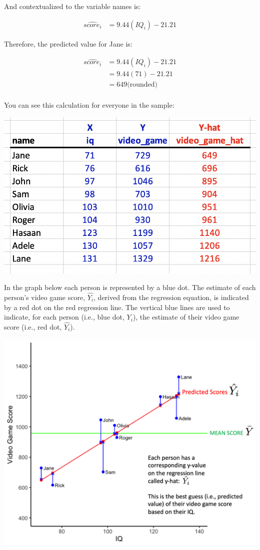 \documentclass[
]{krantz}
\begin{document}
And contextualized to the variable names is:

\[
\begin{aligned}
\widehat{score_i} &= 9.44(IQ_i) -21.21
\end{aligned}
\]

Therefore, the predicted value for Jane is:

\[
\begin{aligned}
\widehat{score_i} &= 9.44(IQ_i) -21.21 \\
&= 9.44(71) - 21.21 \\
&= 649 \text{(rounded)} \\
\end{aligned}
\]

You can see this calculation for everyone in the sample:

\includegraphics[width=13.61in]{ch_correlation/images/yhat_data}

In the graph below each person is represented by a blue dot. The estimate of each person's video game score, \(\hat{Y_i}\), derived from the regression equation, is indicated by a red dot on the red regression line. The vertical blue lines are used to indicate, for each person (i.e., blue dot, \(Y_i\)), the estimate of their video game score (i.e., red dot, \(\hat{Y_i}\)).

\includegraphics[width=0.8\linewidth]{ch_correlation/images/sample_plot4}
\end{document}
